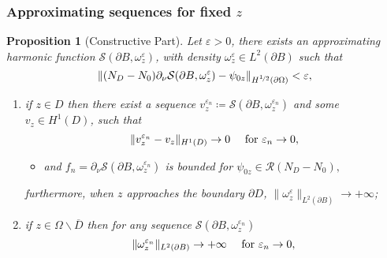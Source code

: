 \documentclass[10pt,xcolor={dvipsnames}]{beamer}
\newtheorem{proposition}[subsection]{Proposition}
\theoremstyle{plain}
\theoremstyle{plain}
\let\epsilon\varepsilon
\begin{document}
\begin{frame}
 \frametitle{Approximating sequences for fixed $z$}
\begin{proposition}[Constructive Part]
\footnotesize
\label{prop:lsm-constructive}
Let $\epsilon > 0$, there exists an {\color{blue}approximating harmonic function} $\mathcal{S}(\partial B, \omega^\epsilon_z)$, with density $\omega^\epsilon_z\in L^2(\partial B)$  such that
\begin{equation}
 \|({N_D} - {N_0})\partial_\nu\mathcal{S}(\partial B, \omega^\epsilon_z) - \psi_{0z}\|_{H^{\nicefrac{1}{2}}(\partial\Omega)} < \epsilon,
\end{equation}
\vspace{-0.4cm}
\begin{enumerate}
 \item if {\color{blue}$z \in D$}  
  then there exist a sequence 
 $v^{\epsilon_n}_z\coloneqq\mathcal{S}(\partial B, \omega^{\epsilon_n}_z)$ 
 and some
 $ v_z\in H^1(D)$, such that
  \begin{equation}
 \|v^{\epsilon_n}_z - v_z\|_{H^1(D)} \to 0\quad\textup{ for }\epsilon_n \to 0,
  \end{equation}
  \vspace{-0.6cm}
  \begin{itemize}
   \item[$\blacktriangleright$] and $f_n = \partial_\nu\mathcal{S}(\partial B,\omega_z^{\epsilon_n})$
   is bounded for $\psi_{0z}\in\mathcal{R}(N_D - N_0),$
  \end{itemize}
  furthermore, when $z$ approaches the boundary $\partial D$, $\|\omega^\epsilon_z\|_{L^2(\partial B)}\to + \infty$;
 \item if {\color{blue}$z \in \Omega\backslash\overline{D}$} then for any 
 sequence $\mathcal{S}(\partial B, \omega^{\epsilon_n}_z)$
\begin{equation}
\|\omega^{\epsilon_n}_z\|_{L^2(\partial B)}\to + \infty\quad\textup{ for }\epsilon_n \to 0,

\end{equation}
\end{enumerate}
\end{proposition}
\end{frame}
\end{document}
